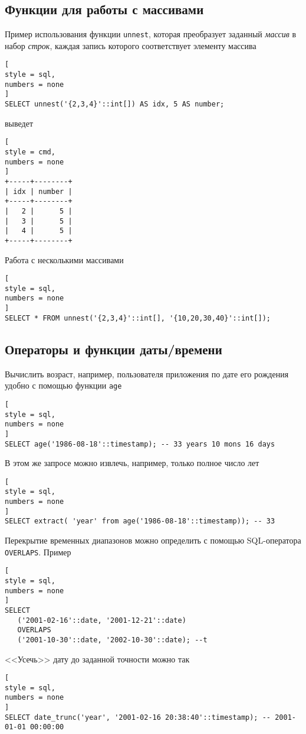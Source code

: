 \documentclass[%
	11pt,
	a4paper,
	utf8,
		]{article}
\begin{document}
\subsection{Функции для работы с массивами}

Пример использования функции \texttt{unnest}, которая преобразует заданный \emph{массив} в набор \emph{строк}, каждая запись которого соответствует элементу массива
\begin{lstlisting}[
style = sql,
numbers = none
]
SELECT unnest('{2,3,4}'::int[]) AS idx, 5 AS number;
\end{lstlisting}
выведет
\begin{lstlisting}[
style = cmd,
numbers = none
]
+-----+--------+
| idx | number |
+-----+--------+
|   2 |      5 |
|   3 |      5 |
|   4 |      5 |
+-----+--------+
\end{lstlisting}

Работа с несколькими массивами
\begin{lstlisting}[
style = sql,
numbers = none
]
SELECT * FROM unnest('{2,3,4}'::int[], '{10,20,30,40}'::int[]);
\end{lstlisting}


\subsection{Операторы и функции даты/времени}

Вычислить возраст, например, пользователя приложения по дате его рождения удобно с помощью функции \texttt{age}
\begin{lstlisting}[
style = sql,
numbers = none
]
SELECT age('1986-08-18'::timestamp); -- 33 years 10 mons 16 days
\end{lstlisting}

В этом же запросе можно извлечь, например, только полное число лет
\begin{lstlisting}[
style = sql,
numbers = none
]
SELECT extract( 'year' from age('1986-08-18'::timestamp)); -- 33
\end{lstlisting}

Перекрытие временных диапазонов можно определить с помощью SQL-оператора \texttt{OVERLAPS}. Пример
\begin{lstlisting}[
style = sql,
numbers = none
]
SELECT
   ('2001-02-16'::date, '2001-12-21'::date)
   OVERLAPS
   ('2001-10-30'::date, '2002-10-30'::date); --t
\end{lstlisting}

<<Усечь>> дату до заданной точности можно так
\begin{lstlisting}[
style = sql,
numbers = none
]
SELECT date_trunc('year', '2001-02-16 20:38:40'::timestamp); -- 2001-01-01 00:00:00
\end{lstlisting}
\end{document}
